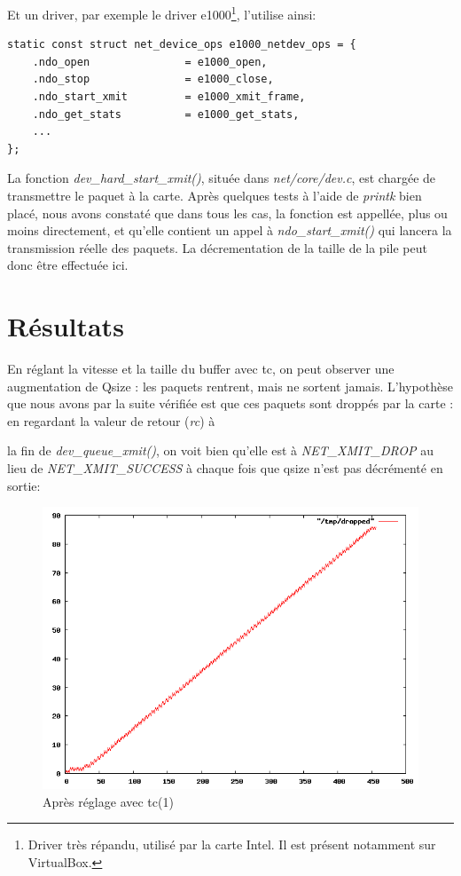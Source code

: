 \documentclass[a4paper]{article}
\begin{document}
Et un driver, par exemple le driver e1000\footnote{Driver très répandu,
utilisé par la carte Intel. Il est présent notamment sur VirtualBox.},
l'utilise ainsi:
\begin{verbatim}
static const struct net_device_ops e1000_netdev_ops = {
    .ndo_open               = e1000_open,
    .ndo_stop               = e1000_close,
    .ndo_start_xmit         = e1000_xmit_frame,
    .ndo_get_stats          = e1000_get_stats,
    ...
};
\end{verbatim}

La fonction \textit{dev\_hard\_start\_xmit()}, située dans
\textit{net/core/dev.c}, est chargée de transmettre le paquet
à la carte. Après quelques tests à l'aide de \textit{printk} bien
placé, nous avons constaté que dans tous les cas, la fonction
est appellée, plus ou moins directement, et qu'elle contient 
un appel à \textit{ndo\_start\_xmit()} qui lancera la transmission réelle des paquets. La décrementation de la
taille de la pile peut donc être effectuée ici.

\section{Résultats}
En réglant la vitesse et la taille du buffer avec tc, on peut observer
une augmentation de Qsize : les paquets rentrent, mais ne sortent jamais.
L'hypothèse que nous avons par la suite vérifiée est que ces paquets
sont droppés par la carte : en regardant la valeur de retour (\textit{rc}) à

la  fin de \textit{dev\_queue\_xmit()}, on voit bien  qu'elle est à
\textit{NET\_XMIT\_DROP} au lieu de \textit{NET\_XMIT\_SUCCESS} à chaque
fois que qsize n'est pas décrémenté
en sortie:
\begin{figure}[!ht]
	\centering
	\includegraphics[scale=.5]{dropped.png}
	\caption{\label{dropped} Après réglage avec tc(1)}
\end{figure}
\end{document}
